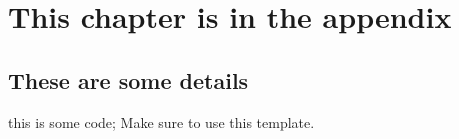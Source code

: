 \documentclass[12pt, a4paper]{report}
\newenvironment{code}
{\footnotesize\verbatim}{\endverbatim\normalfont}
\theoremstyle{definition}
\newtheorem{definition}{Definition}[section]
\theoremstyle{definition}%
\newtheorem{example}{Example}[section]
\theoremstyle{definition}%
\theoremstyle{definition}%
\theoremstyle{definition}%
\theoremstyle{definition}%
\begin{document}











\appendix

\chapter{This chapter is in the appendix}
\section{These are some details}
\begin{code}
    this is some code;
    Make sure to use this template.
\end{code}


\bibliomatter





\end{document}
